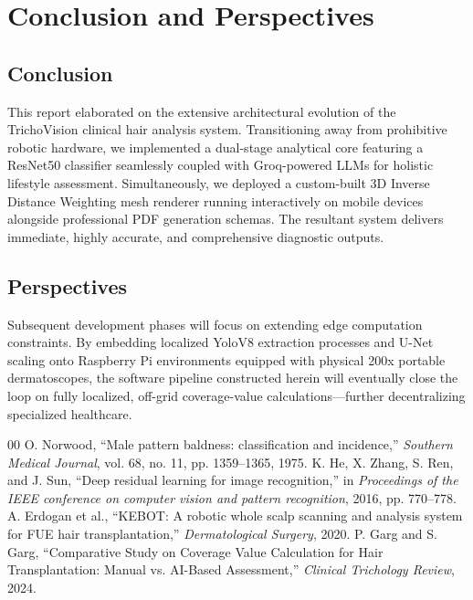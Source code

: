 \documentclass[12pt, a4paper]{article}
\begin{document}
\section{Conclusion and Perspectives}

\subsection{Conclusion}
This report elaborated on the extensive architectural evolution of the TrichoVision clinical hair analysis system. Transitioning away from prohibitive robotic hardware, we implemented a dual-stage analytical core featuring a ResNet50 classifier seamlessly coupled with Groq-powered LLMs for holistic lifestyle assessment. Simultaneously, we deployed a custom-built 3D Inverse Distance Weighting mesh renderer running interactively on mobile devices alongside professional PDF generation schemas. The resultant system delivers immediate, highly accurate, and comprehensive diagnostic outputs.

\subsection{Perspectives}
Subsequent development phases will focus on extending edge computation constraints. By embedding localized YoloV8 extraction processes and U-Net scaling onto Raspberry Pi environments equipped with physical 200x portable dermatoscopes, the software pipeline constructed herein will eventually close the loop on fully localized, off-grid coverage-value calculations---further decentralizing specialized healthcare.

\vspace{12pt}

\begin{thebibliography}{00}
 O. Norwood, ``Male pattern baldness: classification and incidence,'' \textit{Southern Medical Journal}, vol. 68, no. 11, pp. 1359--1365, 1975.
 K. He, X. Zhang, S. Ren, and J. Sun, ``Deep residual learning for image recognition,'' in \textit{Proceedings of the IEEE conference on computer vision and pattern recognition}, 2016, pp. 770--778.
 A. Erdogan et al., ``KEBOT: A robotic whole scalp scanning and analysis system for FUE hair transplantation,'' \textit{Dermatological Surgery}, 2020.
 P. Garg and S. Garg, ``Comparative Study on Coverage Value Calculation for Hair Transplantation: Manual vs. AI-Based Assessment,'' \textit{Clinical Trichology Review}, 2024.
\end{thebibliography}
\end{document}
